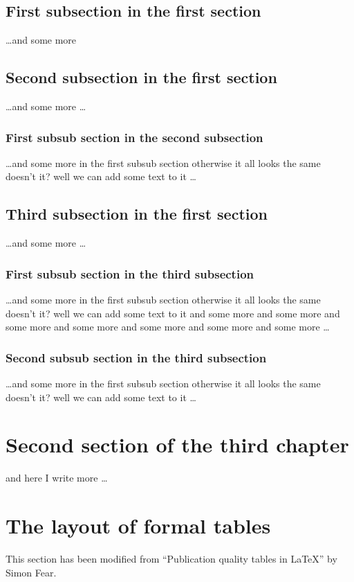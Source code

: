 \documentclass[a4paper,12pt,times,print,index,custombib,custommargin]{PhDThesisPSnPDF}\usepackage[]{graphicx}\usepackage[]{color}
\begin{document}
\subsection{First subsection in the first section}
\dots and some more 

\subsection{Second subsection in the first section}
\dots and some more \dots

\subsubsection{First subsub section in the second subsection}
\dots and some more in the first subsub section otherwise it all looks the same
doesn't it? well we can add some text to it \dots

\subsection{Third subsection in the first section}
\dots and some more \dots

\subsubsection{First subsub section in the third subsection}
\dots and some more in the first subsub section otherwise it all looks the same
doesn't it? well we can add some text to it and some more and some more and
some more and some more and some more and some more and some more \dots

\subsubsection{Second subsub section in the third subsection}
\dots and some more in the first subsub section otherwise it all looks the same
doesn't it? well we can add some text to it \dots

\section{Second section of the third chapter}
and here I write more \dots

\section{The layout of formal tables}
This section has been modified from ``Publication quality tables in \LaTeX*''
 by Simon Fear.
\end{document}
